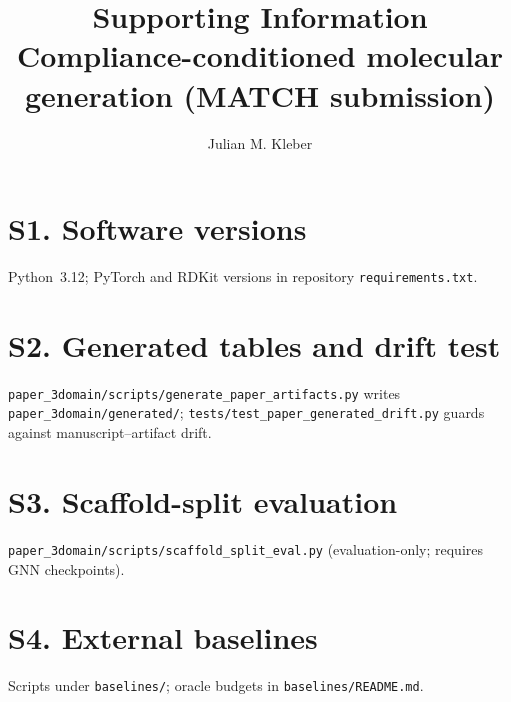 \documentclass[12pt]{article}
\title{Supporting Information\\\large Compliance-conditioned molecular generation (MATCH submission)}
\author{Julian M. Kleber}
\begin{document}
\maketitle

\section*{S1. Software versions}
Python~3.12; PyTorch and RDKit versions in repository \texttt{requirements.txt}.

\section*{S2. Generated tables and drift test}
\texttt{paper\_3domain/scripts/generate\_paper\_artifacts.py} writes \texttt{paper\_3domain/generated/};
\texttt{tests/test\_paper\_generated\_drift.py} guards against manuscript--artifact drift.

\section*{S3. Scaffold-split evaluation}
\texttt{paper\_3domain/scripts/scaffold\_split\_eval.py} (evaluation-only; requires GNN checkpoints).

\section*{S4. External baselines}
Scripts under \texttt{baselines/}; oracle budgets in \texttt{baselines/README.md}.
\end{document}
